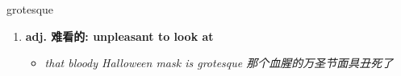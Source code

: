 
\begin{frame}
{\huge grotesque}
\begin{center}
\begin{enumerate}\Large
  \item \textbf{adj. 难看的: unpleasant to look at}
  \begin{itemize}
    \item \em{\Large{that bloody Halloween mask is grotesque 那个血腥的万圣节面具丑死了}}
  \end{itemize}
\end{enumerate}
\end{center}
\end{frame}
